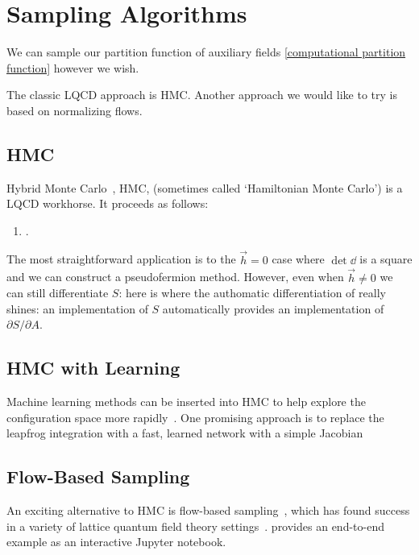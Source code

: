 \section{Sampling Algorithms}\label{sec:sampling}

We can sample our partition function of auxiliary fields \eqref{computational partition function} however we wish.

The classic LQCD approach is HMC.
Another approach we would like to try is based on normalizing flows.

\subsection{HMC}

Hybrid Monte Carlo~\cite{Duane1987}, HMC, (sometimes called `Hamiltonian Monte Carlo') is a LQCD workhorse.
It proceeds as follows:

\begin{enumerate}
	\item {}.
\end{enumerate}

The most straightforward application is to the $\vec{h}=0$ case where $\det \dd$ is a square and we can construct a pseudofermion method.
However, even when $\vec{h}\neq0$ we can still differentiate $S$: here is where the authomatic differentiation of \pytorch really shines: an implementation of $S$ automatically provides an implementation of $\partial S/\partial A$.

\subsection{HMC with Learning}

Machine learning methods can be inserted into HMC to help explore the configuration space more rapidly~\cite{Foreman:2021ljl}.
One promising approach is to replace the leapfrog integration with a fast, learned network with a simple Jacobian~\cite{Foreman:2021rhs}

\subsection{Flow-Based Sampling}

An exciting alternative to HMC is flow-based sampling~\cite{Albergo:2019eim,Rezende:2020hrd,Kanwar:2020xzo}, which has found success in a variety of lattice quantum field theory settings~\cite{Albergo:2022qfi}.
 provides an end-to-end example as an interactive Jupyter notebook.
